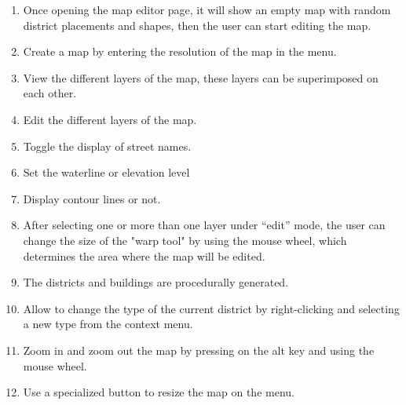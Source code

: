 \begin{enumerate}
  \item Once opening the map editor page, it will show an empty map with random district placements and shapes, then the user can start editing the map.
  \item Create a map by entering the resolution of the map in the menu.
  \item View the different layers of the map, these layers can be superimposed on each other.
  \item Edit the different layers of the map.
  \item Toggle the display of street names.
  \item Set the waterline or elevation level
  \item Display contour lines or not.
  \item After selecting one or more than one layer under ``edit'' mode, the user can change the size of the "warp tool" by using the mouse wheel, which determines the area where the map will be edited.
  \item The districts and buildings are procedurally generated.
  \item Allow to change the type of the current district by right-clicking and selecting a new type from the context menu.
  \item Zoom in and zoom out the map by pressing on the alt key and using the mouse wheel.
  \item Use a specialized button to resize the map on the menu.
\end{enumerate}
